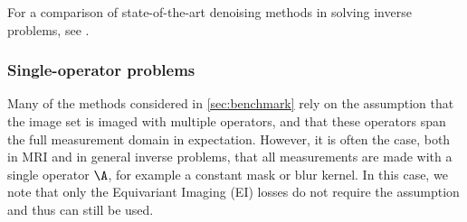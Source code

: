 For a comparison of state-of-the-art denoising methods in solving inverse problems, see \cite{tachella_unsure_2025}.

\subsubsection{Single-operator problems}
\label{sec:single_operator}

Many of the methods considered in \cref{sec:benchmark} rely on the assumption that the image set is imaged with multiple operators, and that these operators span the full measurement domain in expectation. However, it is often the case, both in MRI and in general inverse problems, that all measurements are made with a single operator $\A$, for example a constant mask or blur kernel. In this case, we note that only the Equivariant Imaging (EI) losses \cite{chen_equivariant_2021} do not require the assumption and thus can still be used.